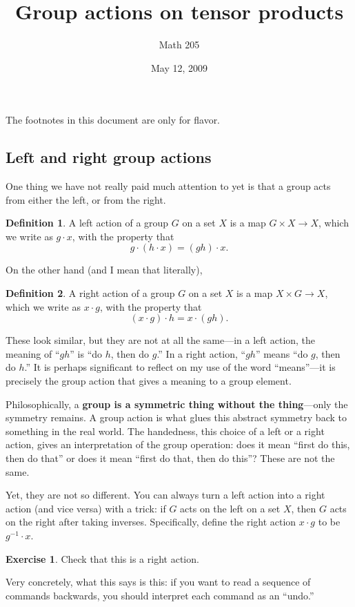 \documentclass[12pt]{article}
\title{Group actions on tensor products}
\author{Math 205}
\date{May 12, 2009}
\theoremstyle{definition}
\newtheorem*{definition}{Definition}
\newtheorem*{exercise}{Exercise}
\begin{document}
\maketitle

The footnotes in this document are only for flavor.

\subsection*{Left and right group actions}

One thing we have not really paid much attention to yet is that a
group acts from either the left, or from the right.
\begin{definition}
  A left action of a group $G$ on a set $X$ is a map $G \times X \to
  X$, which we write as $g \cdot x$, with the property that
$$
g \cdot (h \cdot x) = (gh) \cdot x.
$$
\end{definition}
\noindent
On the other hand (and I mean that literally),
\begin{definition}
  A right action of a group $G$ on a set $X$ is a map $X \times G \to
  X$, which we write as $x \cdot g$, with the property that
$$
(x \cdot g) \cdot h = x \cdot (gh).
$$
\end{definition}
These look similar, but they are not at all the same---in a left
action, the meaning of ``$gh$'' is ``do $h$, then do $g$.''  In a
right action, ``$gh$'' means ``do $g$, then do $h$.''  It is perhaps
significant to reflect on my use of the word ``means''---it is
precisely the group action that gives a meaning to a group element.

Philosophically, a \textbf{group is a symmetric thing without the
  thing}---only the symmetry remains.  A
group action is what glues this abstract symmetry back to something in
the real world.  The handedness, this choice of a left or a right
action, gives an interpretation of the group operation: does it mean
``first do this, then do that'' or does it mean ``first do that, then
do this''?  These are not the same.

Yet, they are not so different.  You can always turn a left action
into a right action (and vice versa) with a trick: if $G$ acts on the
left on a set $X$, then $G$ acts on the right after taking inverses.
Specifically, define the right action $x \cdot g$ to be $g^{-1} \cdot
x$.
\begin{exercise}
Check that this is a right action.
\end{exercise}
\noindent
Very concretely, what this says is this: if you want to read a
sequence of commands backwards, you should interpret each command as
an ``undo.''
\end{document}

